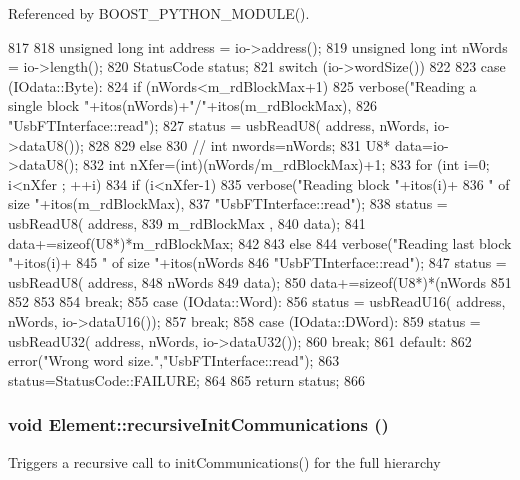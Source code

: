 Referenced by BOOST\_\-PYTHON\_\-MODULE().


\begin{DoxyCode}
817                                          {
818   unsigned long int address = io->address();
819   unsigned long int nWords  = io->length();
820   StatusCode status;
821   switch (io->wordSize())
822   {
823   case (IOdata::Byte):
824     if (nWords<m_rdBlockMax+1){
825       verbose("Reading a single block "+itos(nWords)+"/"+itos(m_rdBlockMax),
826           "UsbFTInterface::read");
827       status = usbReadU8( address, nWords, io->dataU8());   
828     }
829     else {
830       //      int nwords=nWords;
831       U8* data=io->dataU8();
832       int nXfer=(int)(nWords/m_rdBlockMax)+1;
833       for (int i=0; i<nXfer ; ++i){
834     if (i<nXfer-1){
835       verbose("Reading block "+itos(i)+
836           " of size "+itos(m_rdBlockMax),
837           "UsbFTInterface::read");
838       status = usbReadU8( address, 
839                   m_rdBlockMax , 
840                   data);
841       data+=sizeof(U8*)*m_rdBlockMax;
842     }
843     else {
844       verbose("Reading last block "+itos(i)+
845           " of size "+itos(nWords%
846           "UsbFTInterface::read");
847       status = usbReadU8( address, 
848                   nWords%
849                   data); 
850       data+=sizeof(U8*)*(nWords%
851     }
852       }
853     }
854     break;
855   case (IOdata::Word):
856     status = usbReadU16( address, nWords, io->dataU16());
857     break;
858   case (IOdata::DWord):
859     status = usbReadU32( address, nWords, io->dataU32());
860     break;
861   default:
862     error("Wrong word size.","UsbFTInterface::read");
863     status=StatusCode::FAILURE;
864   }
865   return status;
866 }
\end{DoxyCode}
\hypertarget{classElement_a82119ed37dff76508a2746a853ec35ba}{
\subsubsection[{recursiveInitCommunications}]{\setlength{\rightskip}{0pt plus 5cm}void Element::recursiveInitCommunications ()}}
\label{classElement_a82119ed37dff76508a2746a853ec35ba}
Triggers a recursive call to initCommunications() for the full hierarchy

